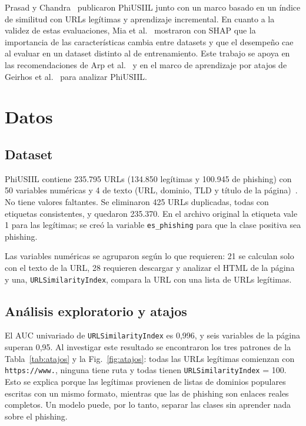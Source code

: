 Prasad y Chandra~\cite{prasad2024} publicaron PhiUSIIL junto con un marco basado en un índice de similitud con URLs legítimas y aprendizaje incremental. En cuanto a la validez de estas evaluaciones, Mia et al.~\cite{mia2024} mostraron con SHAP que la importancia de las características cambia entre datasets y que el desempeño cae al evaluar en un dataset distinto al de entrenamiento. Este trabajo se apoya en las recomendaciones de Arp et al.~\cite{arp2022} y en el marco de aprendizaje por atajos de Geirhos et al.~\cite{geirhos2020} para analizar PhiUSIIL.

\section{Datos}

\subsection{Dataset}
PhiUSIIL contiene 235.795 URLs (134.850 legítimas y 100.945 de phishing) con 50 variables numéricas y 4 de texto (URL, dominio, TLD y título de la página)~\cite{prasad2024}. No tiene valores faltantes. Se eliminaron 425 URLs duplicadas, todas con etiquetas consistentes, y quedaron 235.370. En el archivo original la etiqueta vale 1 para las legítimas; se creó la variable \texttt{es\_phishing} para que la clase positiva sea phishing.

Las variables numéricas se agruparon según lo que requieren: 21 se calculan solo con el texto de la URL, 28 requieren descargar y analizar el HTML de la página y una, \texttt{URLSimilarityIndex}, compara la URL con una lista de URLs legítimas.

\subsection{Análisis exploratorio y atajos}
El AUC univariado de \texttt{URLSimilarityIndex} es 0,996, y seis variables de la página superan 0,95. Al investigar este resultado se encontraron los tres patrones de la Tabla~\ref{tab:atajos} y la Fig.~\ref{fig:atajos}: todas las URLs legítimas comienzan con \texttt{https://www.}, ninguna tiene ruta y todas tienen \texttt{URLSimilarityIndex} = 100. Esto se explica porque las legítimas provienen de listas de dominios populares escritas con un mismo formato, mientras que las de phishing son enlaces reales completos. Un modelo puede, por lo tanto, separar las clases sin aprender nada sobre el phishing.

